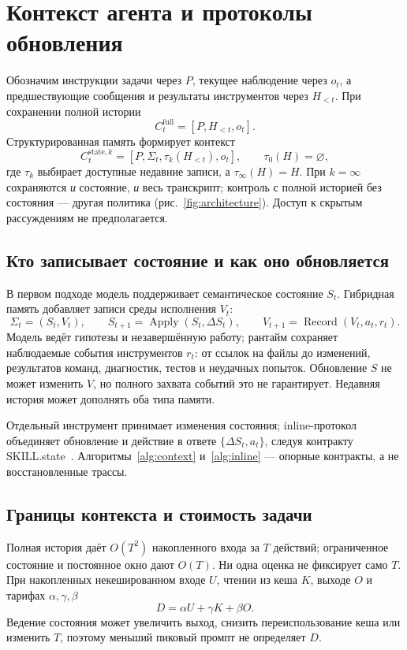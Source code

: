 \section{Контекст агента и протоколы обновления}
\label{sec:model}
Обозначим инструкции задачи через $P$, текущее наблюдение через $o_t$,
а предшествующие сообщения и результаты инструментов через $H_{<t}$.
При сохранении полной истории
\begin{equation}
 C_t^{\mathrm{full}}=[P,H_{<t},o_t].
 \label{eq:ctx-transcript}
\end{equation}
Структурированная память формирует контекст
\begin{equation}
 C_t^{\mathrm{state},k}=[P,\Sigma_t,\tau_k(H_{<t}),o_t],
 \qquad \tau_0(H)=\varnothing,
 \label{eq:ctx-state}
\end{equation}
где $\tau_k$ выбирает доступные недавние записи, а $\tau_\infty(H)=H$.
При $k=\infty$ сохраняются \emph{и} состояние, \emph{и} весь транскрипт;
контроль с полной историей без состояния --- другая политика
(рис.~\ref{fig:architecture}). Доступ к скрытым рассуждениям не предполагается.


\subsection{Кто записывает состояние и как оно обновляется}
В первом подходе модель поддерживает семантическое состояние $S_t$.
Гибридная память добавляет записи среды исполнения $V_t$:
\begin{equation}
 \Sigma_t=(S_t,V_t),\qquad
 S_{t+1}=\operatorname{Apply}(S_t,\Delta S_t),\qquad
 V_{t+1}=\operatorname{Record}(V_t,a_t,r_t).
 \label{eq:ownership}
\end{equation}
Модель ведёт гипотезы и незавершённую работу; рантайм сохраняет наблюдаемые
события инструментов $r_t$: от ссылок на файлы до изменений, результатов
команд, диагностик, тестов и неудачных попыток. Обновление $S$ не может
изменить $V$, но полного захвата событий это не гарантирует. Недавняя
история может дополнять оба типа памяти.

Отдельный инструмент принимает изменения состояния; inline-протокол
объединяет обновление и действие в ответе $\{\Delta S_t,a_t\}$, следуя
контракту SKILL.state~\citep{skillstate2026}. Алгоритмы~\ref{alg:context}
и~\ref{alg:inline} --- опорные контракты, а не восстановленные трассы.


\subsection{Границы контекста и стоимость задачи}
Полная история даёт $O(T^2)$ накопленного входа за $T$ действий;
ограниченное состояние и постоянное окно дают $O(T)$. Ни одна оценка
не фиксирует само $T$. При накопленных некешированном входе $U$, чтении
из кеша $K$, выходе $O$ и тарифах $\alpha,\gamma,\beta$
\begin{equation}
 D=\alpha U+\gamma K+\beta O.
 \label{eq:cost-model}
\end{equation}
Ведение состояния может увеличить выход, снизить переиспользование кеша
или изменить $T$, поэтому меньший пиковый промпт не определяет $D$.
